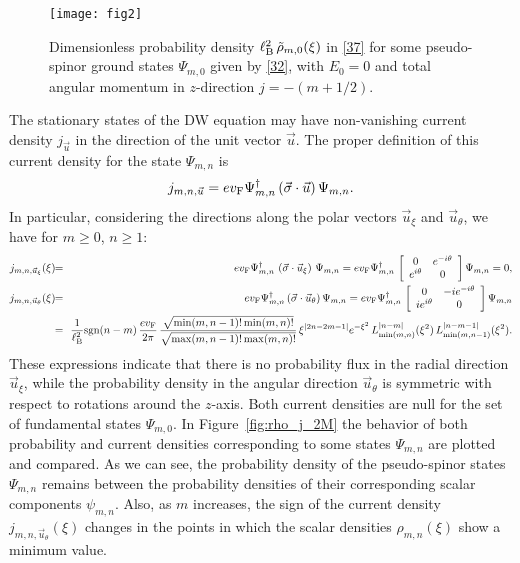 \documentclass[aps,showpacs,showkeys]{revtex4}
\begin{document}
\begin{figure}[htb]
	\centering
	\begin{minipage}[b]{0.34\linewidth}
		\texttt{[image: fig2]}
	\end{minipage}
	\caption{\label{fig:rho_NM} Dimensionless probability density $\ell_{\rm B}^{2}\, \tilde{\rho}_{m,0}(\xi)$ in \eqref{37} for some pseudo-spinor ground states $\Psi_{m,0}$ given by \eqref{32}, with $E_0=0$ and total angular momentum in $z$-direction $j=-(m+1/2)$.}
\end{figure}


The stationary states of the DW equation may have non-vanishing current density $j_{\vec{u}}$ in the direction of the unit vector $\vec{u}$. The proper definition of this current density for the state $\Psi_{m,n}$ is
\begin{equation}\label{38}
j_{m,n,\vec{u}}=ev_{\rm F}\Psi_{m,n}^\dagger\,(\vec{\sigma}\cdot\vec{u})\,\Psi_{m,n}.
\end{equation}
In particular, considering the directions along the polar vectors $\vec{u}_\xi$ and $\vec{u}_\theta$, we have for $m\geq0$, $n\geq1$:
\begin{eqnarray}
   j_{m,n,\vec{u}_\xi}(\xi) \!&\!=\!&\! ev_{\rm F}\Psi_{m,n}^\dagger\,\left(\vec{\sigma}\cdot\vec{u}_\xi\right)\,\Psi_{m,n}= ev_{\rm F}\Psi_{m,n}^\dagger\,\left[\begin{array}{c c}
0 & e^{-i\theta} \\
e^{i\theta} & 0
\end{array}\right]\Psi_{m,n}=0, 
\label{39a} 
\\
   j_{m,n,\vec{u}_\theta}(\xi)\!&\!=\!&\! ev_{\rm F}\Psi_{m,n}^\dagger\,(\vec{\sigma}\cdot\vec{u}_\theta)\,\Psi_{m,n}= ev_{\rm F}\Psi_{m,n}^\dagger\,\left[\begin{array}{c c}
0 & -ie^{-i\theta} \\
ie^{i\theta} & 0
\end{array}\right]\Psi_{m,n} \nonumber
\\
  \!&\!=\!&\! \frac1{\ell_{\rm B}^{2}} \textrm{sgn}(n-m)\,  \frac{ev_{\rm F}}{2\pi} \, \frac{\sqrt{\min(m,n-1)!\min(m,n)!}}{\sqrt{\max(m,n-1)!\max(m,n)!}} 
\, \xi^{\vert2n-2m-1\vert}  e^{-\xi^2}\, L_{\min(m,n)}^{\vert n-m\vert}(\xi^2) \, L_{\min(m,n-1)}^{\vert n-m-1\vert }(\xi^2). \label{39b}
\end{eqnarray}
These expressions indicate that there is no probability flux in the radial direction $\vec{u}_\xi$, while the probability density in the angular direction $\vec{u}_\theta$ is symmetric with respect to rotations around the $z$-axis. Both current densities are null for the set of fundamental states $\Psi_{m,0}$. In Figure~\ref{fig:rho_j_2M} the behavior of both probability and current densities corresponding to some states $\Psi_{m,n}$ are plotted and compared. As we can see, the probability density of the pseudo-spinor states $\Psi_{m,n}$ remains between the probability densities of their corresponding scalar components $\psi_{m,n}$. Also, as $m$ increases, the sign of the current density $j_{m,n,\vec{u}_\theta}(\xi)$ changes in the points in which the scalar densities $\rho_{m,n}(\xi)$ show a minimum value.
\end{document}
